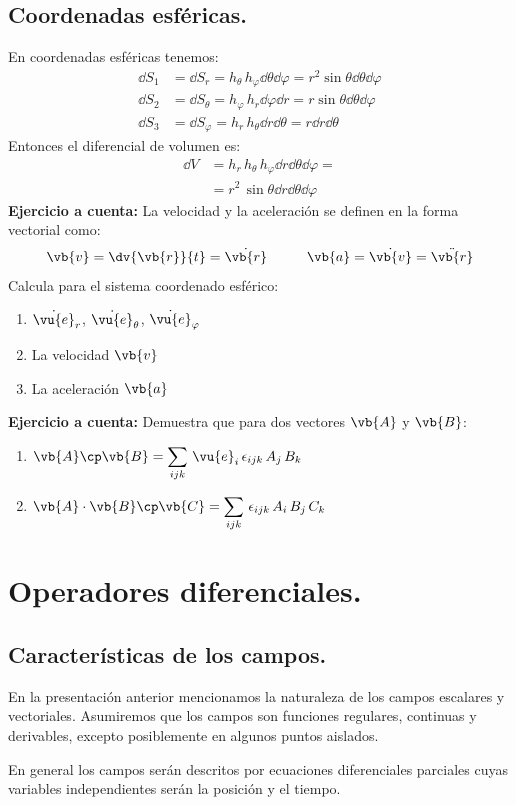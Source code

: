 \subsection{Coordenadas esféricas.}
En coordenadas esféricas tenemos:
\begin{align*}
\dd{S_{1}} &= \dd{S_{r}} = h_{\theta} \, h_{\varphi} \dd{\theta} \dd{\varphi} = r^{2} \sin \theta \dd{\theta} \dd{\varphi} \\[0.5em]
\dd{S_{2}} &= \dd{S_{\theta}} = h_{\varphi} \, h_{r} \dd{\varphi} \dd{r} = r \sin \theta \dd{\theta} \dd{\varphi} \\[0.5em]
\dd{S_{3}} &= \dd{S_{\varphi}} = h_{r} \, h_{\theta} \dd{r} \dd{\theta} = r \dd{r} \dd{\theta}
\end{align*}
Entonces el diferencial de volumen es:
\begin{align*}
\dd{V} &= h_{r} \, h_{\theta} \, h_{\varphi} \dd{r} \dd{\theta} \dd{\varphi} = \\[0.5em]
&= r^{2} \, \sin \theta \dd{r} \dd{\theta} \dd{\varphi}
\end{align*}
\textbf{Ejercicio a cuenta:}
La velocidad y la aceleración se definen en la forma vectorial como:
\begin{align*}
\vb{v} = \dv{\vb{r}}{t} = \dot{\vb{r}} \hspace{1cm} \vb{a} = \dot{\vb{v}} = \ddot{\vb{r}}
\end{align*}
Calcula para el sistema coordenado esférico:
\begin{enumerate}
\item $\dot{\vu{e}}_{r}$, $\dot{\vu{e}}_{\theta}$, $\dot{\vu{e}}_{\varphi}$ 
\item La velocidad $\vb{v}$
\item La aceleración $\vb{a}$
\end{enumerate}
\textbf{Ejercicio a cuenta:} Demuestra que para dos vectores $\vb{A}$ y $\vb{B}$:
\begin{enumerate}
\item $\vb{A} \cp \vb{B} = \displaystyle \sum_{ijk} \, \vu{e}_{i} \, \epsilon_{ijk} \, A_{j} \, B_{k}$
\item $\vb{A} \cdot \vb{B} \cp \vb{C} = \displaystyle \sum_{ijk} \, \epsilon_{ijk} \, A_{i} \, B_{j} \, C_{k}$
\end{enumerate}
\section{Operadores diferenciales.}
\subsection{Características de los campos.}
En la presentación anterior mencionamos la naturaleza de los campos escalares y vectoriales. Asumiremos que los campos son funciones regulares, continuas y derivables, excepto posiblemente en algunos puntos aislados.
\par
En general los campos serán descritos por ecuaciones diferenciales parciales cuyas variables independientes serán la posición y el tiempo.
